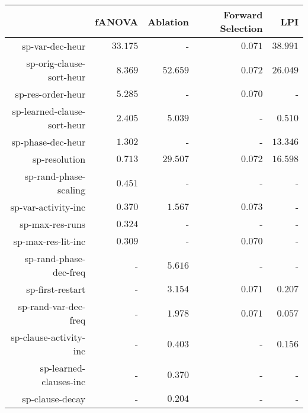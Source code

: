 \begin{table}
\begin{tabular}{r|r|r|r|r}
\toprule
                            &      fANOVA       &     Ablation      & Forward Selection &        LPI       \\
\hline
sp-var-dec-heur             & $         33.175$ &                 - & $          0.071$ & $         38.991$\\
sp-orig-clause-sort-heur    & $          8.369$ & $         52.659$ & $          0.072$ & $         26.049$\\
sp-res-order-heur           & $          5.285$ &                 - & $          0.070$ &                 -\\
sp-learned-clause-sort-heur & $          2.405$ & $          5.039$ &                 - & $          0.510$\\
sp-phase-dec-heur           & $          1.302$ &                 - &                 - & $         13.346$\\
sp-resolution               & $          0.713$ & $         29.507$ & $          0.072$ & $         16.598$\\
sp-rand-phase-scaling       & $          0.451$ &                 - &                 - &                 -\\
sp-var-activity-inc         & $          0.370$ & $          1.567$ & $          0.073$ &                 -\\
sp-max-res-runs             & $          0.324$ &                 - &                 - &                 -\\
sp-max-res-lit-inc          & $          0.309$ &                 - & $          0.070$ &                 -\\
sp-rand-phase-dec-freq      &                 - & $          5.616$ &                 - &                 -\\
sp-first-restart            &                 - & $          3.154$ & $          0.071$ & $          0.207$\\
sp-rand-var-dec-freq        &                 - & $          1.978$ & $          0.071$ & $          0.057$\\
sp-clause-activity-inc      &                 - & $          0.403$ &                 - & $          0.156$\\
sp-learned-clauses-inc      &                 - & $          0.370$ &                 - &                 -\\
sp-clause-decay             &                 - & $          0.204$ &                 - &                 -\\

\end{tabular}
\end{table}
